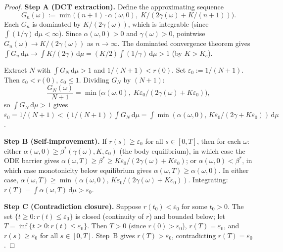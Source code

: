 \documentclass[11pt,a4paper]{article}
\theoremstyle{definition}
\begin{document}
\begin{proof}
\textbf{Step A (DCT extraction).}
Define the approximating sequence
\[
G_n(\omega) := \min\!\bigl((n{+}1)\cdot\alpha(\omega,0),\; K/(2\gamma(\omega) + K/(n{+}1))\bigr).
\]
Each $G_n$ is dominated by $K/(2\gamma(\omega))$, which is integrable (since $\int(1/\gamma)\,\mathrm{d}\mu < \infty$). Since $\alpha(\omega,0) > 0$ and $\gamma(\omega) > 0$, pointwise $G_n(\omega) \to K/(2\gamma(\omega))$ as $n \to \infty$. The dominated convergence theorem gives $\int G_n\,\mathrm{d}\mu \to \int K/(2\gamma)\,\mathrm{d}\mu = (K/2)\int(1/\gamma)\,\mathrm{d}\mu > 1$ (by $K > K_c$).

Extract $N$ with $\int G_N\,\mathrm{d}\mu > 1$ and $1/(N{+}1) < r(0)$. Set $\varepsilon_0 := 1/(N{+}1)$. Then $\varepsilon_0 < r(0)$, $\varepsilon_0 \leq 1$. Dividing $G_N$ by $(N{+}1)$:
\[
\frac{G_N(\omega)}{N{+}1} = \min\!\bigl(\alpha(\omega,0),\; K\varepsilon_0/(2\gamma(\omega)+K\varepsilon_0)\bigr),
\]
so $\int G_N\,\mathrm{d}\mu > 1$ gives $\varepsilon_0 = 1/(N{+}1) < (1/(N{+}1))\int G_N\,\mathrm{d}\mu = \int\min(\alpha(\omega,0),\,K\varepsilon_0/(2\gamma+K\varepsilon_0))\,\mathrm{d}\mu$.

\textbf{Step B (Self-improvement).}
If $r(s) \geq \varepsilon_0$ for all $s \in [0,T]$, then for each $\omega$: either $\alpha(\omega,0) \geq \beta^*(\gamma(\omega),K,\varepsilon_0)$ (the body equilibrium), in which case the ODE barrier gives $\alpha(\omega,T) \geq \beta^* \geq K\varepsilon_0/(2\gamma(\omega)+K\varepsilon_0)$; or $\alpha(\omega,0) < \beta^*$, in which case monotonicity below equilibrium gives $\alpha(\omega,T) \geq \alpha(\omega,0)$. In either case, $\alpha(\omega,T) \geq \min(\alpha(\omega,0),\, K\varepsilon_0/(2\gamma(\omega)+K\varepsilon_0))$. Integrating: $r(T) = \int\alpha(\omega,T)\,\mathrm{d}\mu > \varepsilon_0$.

\textbf{Step C (Contradiction closure).}
Suppose $r(t_0) < \varepsilon_0$ for some $t_0 > 0$. The set $\{t \geq 0 : r(t) \leq \varepsilon_0\}$ is closed (continuity of $r$) and bounded below; let $T = \inf\{t \geq 0 : r(t) \leq \varepsilon_0\}$. Then $T > 0$ (since $r(0) > \varepsilon_0$), $r(T) = \varepsilon_0$, and $r(s) \geq \varepsilon_0$ for all $s \in [0,T]$. Step~B gives $r(T) > \varepsilon_0$, contradicting $r(T) = \varepsilon_0$.
\end{proof}
\end{document}
